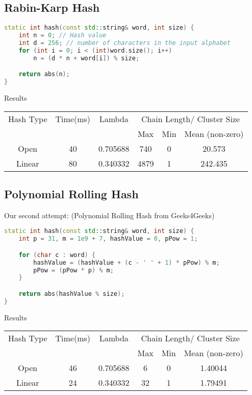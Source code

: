 \documentclass[12pt]{article}
\begin{document}
\subsection{Rabin-Karp Hash}

\begin{lstlisting}[language=C++]
static int hash(const std::string& word, int size) {
    int n = 0; // Hash value
    int d = 256; // number of characters in the input alphabet 
    for (int i = 0; i < (int)word.size(); i++)
        n = (d * n + word[i]) % size;

    return abs(n);
}
\end{lstlisting}

\begin{center}
Results\\
\begin{tabular}{|c|c|c|c|c|c|}
\hline
Hash Type & Time(ms) & Lambda & \multicolumn{3}{|c|}{Chain Length/ Cluster Size} \\
 & & & Max & Min & Mean (non-zero) \\
\hline
Open & 40 & 0.705688 & 740 & 0 & 20.573\\
Linear & 80 & 0.340332 & 4879 & 1 & 242.435\\
\hline
\end{tabular}
\end{center}

\subsection{Polynomial Rolling Hash}

Our second attempt: (Polynomial Rolling Hash from Geeks4Geeks)
\begin{lstlisting}[language=C++]
static int hash(const std::string& word, int size) {
    int p = 31, m = 1e9 + 7, hashValue = 0, pPow = 1;

    for (char c : word) {
        hashValue = (hashValue + (c - ' ' + 1) * pPow) % m;
        pPow = (pPow * p) % m;
    }

    return abs(hashValue % size);
}
\end{lstlisting}

\begin{center}
Results\\
\begin{tabular}{|c|c|c|c|c|c|}
\hline
Hash Type & Time(ms) & Lambda & \multicolumn{3}{|c|}{Chain Length/ Cluster Size} \\
 & & & Max & Min & Mean (non-zero) \\
\hline
Open & 46 & 0.705688 & 6 & 0 & 1.40044\\
Linear & 24 & 0.340332 & 32 & 1 & 1.79491\\
\hline
\end{tabular}
\end{center}
\end{document}
